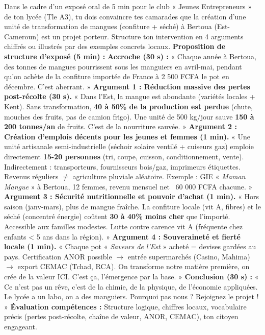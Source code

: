 \documentclass[11pt]{article}
\begin{document}
\begin{exoresolu}
Dans le cadre d'un exposé oral de 5 min pour le club « Jeunes Entrepreneurs » de ton lycée (Tle A3), tu dois convaincre tes camarades que la création d'une unité de transformation de mangues (confiture + séché) à Bertoua (Est-Cameroun) est un projet porteur. Structure ton intervention en 4 arguments chiffrés ou illustrés par des exemples concrets locaux.
\tcblower
\textbf{Proposition de structure d'exposé (5 min) :}
\textbf{Accroche (30 s) :} « Chaque année à Bertoua, des tonnes de mangues pourrissent sous les manguiers en avril-mai, pendant qu'on achète de la confiture importée de France à 2 500 FCFA le pot en décembre. C'est aberrant. »
\textbf{Argument 1 : Réduction massive des pertes post-récolte (30 s).} « Dans l'Est, la mangue est abondante (variétés locales + Kent). Sans transformation, \textbf{40 à 50\% de la production est perdue} (chute, mouches des fruits, pas de camion frigo). Une unité de 500 kg/jour sauve \textbf{150 à 200 tonnes/an} de fruits. C'est de la nourriture sauvée. »
\textbf{Argument 2 : Création d'emplois décents pour les jeunes et femmes (1 min).} « Une unité artisanale semi-industrielle (séchoir solaire ventilé + cuiseurs gaz) emploie directement \textbf{15-20 personnes} (tri, coupe, cuisson, conditionnement, vente). Indirectement : transporteurs, fournisseurs bois/gaz, imprimeurs étiquettes. Revenus réguliers $\neq$ agriculture pluviale aléatoire. Exemple : GIE « \emph{Maman Mangue} » à Bertoua, 12 femmes, revenu mensuel net ~60 000 FCFA chacune. »
\textbf{Argument 3 : Sécurité nutritionnelle et pouvoir d'achat (1 min).} « Hors saison (janv-mars), plus de mangue fraîche. La confiture locale (vit A, fibres) et le séché (concentré énergie) coûtent \textbf{30 à 40\% moins cher} que l'importé. Accessible aux familles modestes. Lutte contre carence vit A (fréquente chez enfants < 5 ans dans la région). »
\textbf{Argument 4 : Souveraineté et fierté locale (1 min).} « Chaque pot « \emph{Saveurs de l'Est} » acheté = devises gardées au pays. Certification ANOR possible $\rightarrow$ entrée supermarchés (Casino, Mahima) $\rightarrow$ export CEMAC (Tchad, RCA). On transforme notre matière première, on crée de la valeur ICI. C'est ça, l'émergence par la base. »
\textbf{Conclusion (30 s) :} « Ce n'est pas un rêve, c'est de la chimie, de la physique, de l'économie appliquées. Le lycée a un labo, on a des manguiers. Pourquoi pas nous ? Rejoignez le projet ! »
\textbf{Évaluation compétences :} Structure logique, chiffres locaux, vocabulaire précis (pertes post-récolte, chaîne de valeur, ANOR, CEMAC), ton citoyen engageant.
\end{exoresolu}
\end{document}
